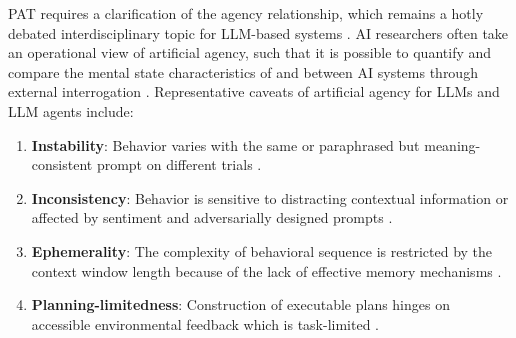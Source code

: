 \documentclass[11pt]{article}
\begin{document}
PAT requires a clarification of the agency relationship, which remains a hotly debated interdisciplinary topic for LLM-based systems \citep{shavit_practices_2023,dai_position_2024,barandiaran_transforming_2024,dung_understanding_2024,perrier_position_2025,mattingly_machine_2025,butlin_agency_2025,das_agency_2025}. AI researchers often take an operational view of artificial agency, such that it is possible to quantify and compare the mental state characteristics of and between AI systems through external interrogation \citep{baird_next_2021,chan_harms_2023,miehling_agentic_2025}. Representative caveats of artificial agency for LLMs and LLM agents include:
\begin{enumerate}[wide, labelindent=0pt, itemsep=-1pt, topsep=1pt]
    \item[\textbullet] \textbf{Instability}: Behavior varies with the same or paraphrased but meaning-consistent prompt on different trials \citep{loya_exploring_2023}.
    \item[\textbullet] \textbf{Inconsistency}: Behavior is sensitive to distracting contextual information or affected by sentiment and adversarially designed prompts \citep{jain_contextual_2023, maus_black_2023,zhuo_prosa_2024}.
    \item[\textbullet] \textbf{Ephemerality}: The complexity of behavioral sequence is restricted by the context window length because of the lack of effective memory mechanisms \citep{maharana_evaluating_2024}.
    \item[\textbullet] \textbf{Planning-limitedness}: Construction of executable plans hinges on accessible environmental feedback which is task-limited \citep{kambhampati_position_2024,wang_executable_2024,chen_can_2024}.
\end{enumerate}


\end{document}
